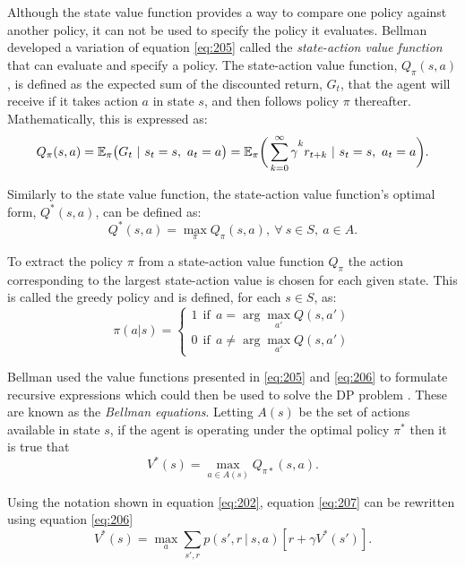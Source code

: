 Although the state value function provides a way to compare one policy against another policy, it can not be used to specify the policy it evaluates. Bellman developed a variation of equation \ref{eq:205} called the \textit{state-action value function} that can evaluate and specify a policy. The state-action value function, $Q_{\pi}(s,a)$, is defined as the expected sum of the discounted return, $G_t$, that the agent will receive if it takes action $a$ in state $s$, and then follows policy $\pi$ thereafter. Mathematically, this is expressed as:
\begin{equation}
	Q_{\pi}(s, a) = \mathbb{E}_{\pi} \big( G_t \ | \ s_t = s, \ a_t = a \big) = \mathbb{E}_{\pi} \bigg( \sum_{k = 0}^{\infty} \gamma\mystrut^k r_{t+k} \ | \ s_t = s, \ a_t = a \bigg). \label{eq:206}
\end{equation}

Similarly to the state value function, the state-action value function's optimal form, $Q^*(s,a)$, can be defined as:
\begin{equation}
	Q^*(s,a) = \max_{\pi} Q_{\pi}(s,a), \ \forall \ s \in S, \ a \in A.
\end{equation}

To extract the policy $\pi$ from a state-action value function $Q_{\pi}$ the action corresponding to the largest state-action value is chosen for each given state. This is called the greedy policy and is defined, for each $s \in S$, as:
\begin{equation}
	\pi (a | s) = %
	   \begin{cases}
	   		1 \ \ \text{if} \ \ a = \arg\max_{a'} Q(s,a') \\
	   		0 \ \ \text{if} \ \ a \neq \arg\max_{a'} Q(s,a')
	   \end{cases} \label{eq:210}
\end{equation} 

Bellman used the value functions presented in \ref{eq:205} and \ref{eq:206} to formulate recursive expressions which could then be used to solve the DP problem \cite{Bellm1957}. These are known as the \textit{Bellman equations}. Letting $A(s)$ be the set of actions available in state $s$, if the agent is operating under the optimal policy $\pi^*$ then it is true that
\begin{equation}
	V^*(s) = \max_{a \in A(s)} Q_{\pi*}(s,a). \label{eq:207}
\end{equation}

Using the notation shown in equation \ref{eq:202}, equation \ref{eq:207} can be rewritten using equation \ref{eq:206}
\begin{equation}
	V^*(s) = \max_{a} \sum_{s',r} p(s', r \ | \ s, a)[r + \gamma V^*(s')]. \label{eq:208}
\end{equation}  


